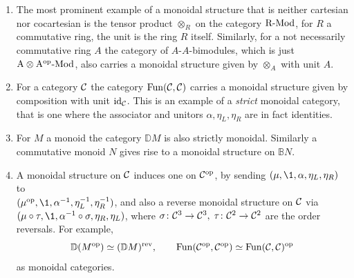 \begin{enumerate}[label=\roman*)]
            \item 
                The most prominent example of a monoidal structure that is neither cartesian nor cocartesian is the tensor product $\otimes_R$ on the category $\operatorname{R-Mod}$, for $R$ a commutative ring, the unit is the ring $R$ itself. Similarly, for a not necessarily commutative ring $A$ the category of $A$-$A$-bimodules, which is just $\operatorname{A \otimes A^{\operatorname{op}}-Mod}$, also carries a monoidal structure given by $\otimes_A$ with unit $A$.
            \item 
                For a category $\mathcal{C}$ the category $\operatorname{Fun}(\mathcal{C}, \mathcal{C})$ carries a monoidal structure given by composition with unit $\operatorname{id}_{\mathcal{C}}$. This is an example of a \emph{strict} monoidal category, that is one where the associator and unitors $\alpha, \eta_L, \eta_R$ are in fact identities.
            \item 
                For $M$ a monoid the category $\mathbb{D}M$ is also strictly monoidal. Similarly a commutative monoid $N$ gives rise to a monoidal structure on $\mathbb{B}N$.
            \item 
                A monoidal structure on $\mathcal{C}$ induces one on $\mathcal{C}^{\operatorname{op}}$, by sending $(\mu, \1, \alpha, \eta_L, \eta_R)$ to \\
                $(\mu^{\op}, \1, \alpha^{-1}, \eta_L^{-1}, \eta_R^{-1})$, and also a reverse monoidal structure on $\mathcal{C}$ via $(\mu \circ \tau, \1, \alpha^{-1} \circ \sigma, \eta_R, \eta_L)$, where $\sigma \colon \mathcal{C}^3 \to \mathcal{C}^3,\; \tau \colon \mathcal{C}^2 \to \mathcal{C}^2$ are the order reversals. For example,
                \begin{equation*}
                    \mathbb{D}(M^{\operatorname{op}}) \simeq (\mathbb{D}M)^{\text{rev}}, \qquad \operatorname{Fun}(\mathcal{C}^{\operatorname{op}}, \mathcal{C}^{\operatorname{op}}) \simeq \operatorname{Fun}(\mathcal{C}, \mathcal{C})^{\operatorname{op}} 
                \end{equation*}
                as monoidal categories.
        \end{enumerate}

